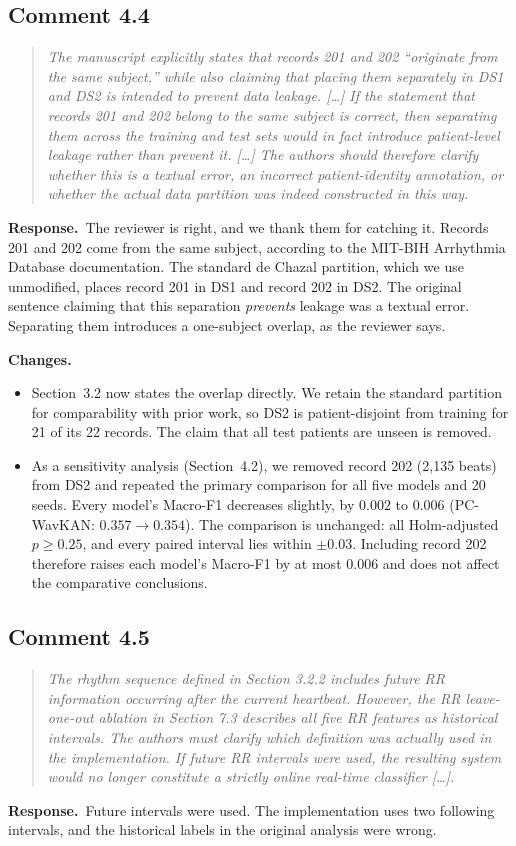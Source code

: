 \documentclass[11pt]{article}
\newenvironment{reviewer}{\begin{quote}\itshape\color{revcol}}{\end{quote}}
\newcommand{\resp}{\textbf{Response.}~}
\newcommand{\chg}{\textbf{Changes.}~}
\begin{document}
\subsection*{Comment 4.4}
\begin{reviewer}
The manuscript explicitly states that records 201 and 202 ``originate from the same subject,'' while also claiming that placing them separately in DS1 and DS2 is intended to prevent data leakage. [\ldots] If the statement that records 201 and 202 belong to the same subject is correct, then separating them across the training and test sets would in fact introduce patient-level leakage rather than prevent it. [\ldots] The authors should therefore clarify whether this is a textual error, an incorrect patient-identity annotation, or whether the actual data partition was indeed constructed in this way.
\end{reviewer}
\resp The reviewer is right, and we thank them for catching it. Records 201 and 202 come from the same subject, according to the MIT-BIH Arrhythmia Database documentation. The standard de Chazal partition, which we use unmodified, places record 201 in DS1 and record 202 in DS2. The original sentence claiming that this separation \emph{prevents} leakage was a textual error. Separating them introduces a one-subject overlap, as the reviewer says.

\chg
\begin{itemize}[leftmargin=1.2em,itemsep=2pt]
\item Section~3.2 now states the overlap directly. We retain the standard partition for comparability with prior work, so DS2 is patient-disjoint from training for 21 of its 22 records. The claim that all test patients are unseen is removed.
\item As a sensitivity analysis (Section~4.2), we removed record 202 (2,135 beats) from DS2 and repeated the primary comparison for all five models and 20 seeds. Every model's Macro-F1 decreases slightly, by $0.002$ to $0.006$ (PC-WavKAN: $0.357\rightarrow0.354$). The comparison is unchanged: all Holm-adjusted $p\geq0.25$, and every paired interval lies within $\pm0.03$. Including record 202 therefore raises each model's Macro-F1 by at most $0.006$ and does not affect the comparative conclusions.
\end{itemize}

\subsection*{Comment 4.5}
\begin{reviewer}
The rhythm sequence defined in Section 3.2.2 includes future RR information occurring after the current heartbeat. However, the RR leave-one-out ablation in Section 7.3 describes all five RR features as historical intervals. The authors must clarify which definition was actually used in the implementation. If future RR intervals were used, the resulting system would no longer constitute a strictly online real-time classifier [\ldots].
\end{reviewer}
\resp Future intervals were used. The implementation uses two following intervals, and the historical labels in the original analysis were wrong.
\end{document}
